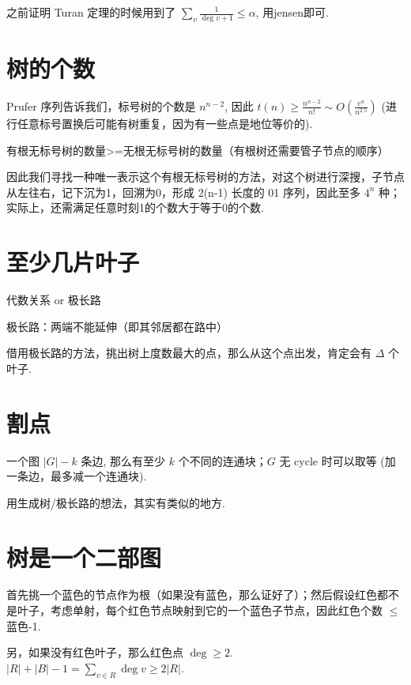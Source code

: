 之前证明 Turan 定理的时候用到了 $\sum_{v}\frac{1}{\deg v+1}\leq \alpha$, 用jensen即可.

\section{树的个数}


Prufer 序列告诉我们，标号树的个数是 $n^{n-2}$, 因此 $t(n)\geq\frac{n^{n-2}}{n!}\sim O(\frac{e^n}{n^{2.5}})$ (进行任意标号置换后可能有树重复，因为有一些点是地位等价的).

有根无标号树的数量>=无根无标号树的数量（有根树还需要管子节点的顺序）

因此我们寻找一种唯一表示这个有根无标号树的方法，对这个树进行深搜，子节点从左往右，记下沉为1，回溯为0，形成 2(n-1) 长度的 01 序列，因此至多 $4^n$ 种；实际上，还需满足任意时刻1的个数大于等于0的个数.

\section{至少几片叶子}


代数关系 or 极长路

极长路：两端不能延伸（即其邻居都在路中）

借用极长路的方法，挑出树上度数最大的点，那么从这个点出发，肯定会有 $\Delta$ 个叶子.

\section{割点}


一个图 $|G|-k$ 条边, 那么有至少 $k$ 个不同的连通块；$G$ 无 cycle 时可以取等 (加一条边，最多减一个连通块).

用生成树/极长路的想法，其实有类似的地方.

\section{树是一个二部图}


首先挑一个蓝色的节点作为根（如果没有蓝色，那么证好了）；然后假设红色都不是叶子，考虑单射，每个红色节点映射到它的一个蓝色子节点，因此红色个数 $\leq$ 蓝色-1.

另，如果没有红色叶子，那么红色点 $\deg\geq2$. $|R|+|B|-1=\sum_{v\in R}\deg v\geq2|R|$.
